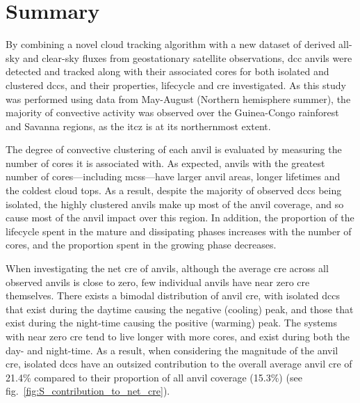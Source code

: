 \section{Summary}  %

By combining a novel cloud tracking algorithm with a new dataset of derived all-sky and clear-sky fluxes from geostationary satellite observations, \acrshort{dcc} anvils were detected and tracked along with their associated cores for both isolated and clustered \acrshort{dcc}s, and their properties, lifecycle and \acrshort{cre} investigated. 
As this study was performed using data from May-August (Northern hemisphere summer), the majority of convective activity was observed over the Guinea-Congo rainforest and Savanna regions, as the \acrshort{itcz} is at its northernmost extent.

The degree of convective clustering of each anvil is evaluated by measuring the number of cores it is associated with. 
As expected, anvils with the greatest number of cores---including \acrshort{mcs}s---have larger anvil areas, longer lifetimes and the coldest cloud tops. 
As a result, despite the majority of observed \acrshort{dcc}s being isolated, the highly clustered anvils make up most of the anvil coverage, and so cause most of the anvil impact over this region. 
In addition, the proportion of the lifecycle spent in the mature and dissipating phases increases with the number of cores, and the proportion spent in the growing phase decreases.

When investigating the net \acrshort{cre} of anvils, although the average \acrshort{cre} across all observed anvils is close to zero, few individual anvils have near zero \acrshort{cre} themselves. 
There exists a bimodal distribution of anvil \acrshort{cre}, with isolated \acrshort{dcc}s that exist during the daytime causing the negative (cooling) peak, and those that exist during the night-time causing the positive (warming) peak. 
The systems with near zero \acrshort{cre} tend to live longer with more cores, and exist during both the day- and night-time. 
As a result, when considering the magnitude of the anvil \acrshort{cre}, isolated \acrshort{dcc}s have an outsized contribution to the overall average anvil \acrshort{cre} of 21.4\% compared to their proportion of all anvil coverage (15.3\%) (see fig.~\ref{fig:S_contribution_to_net_cre}).


